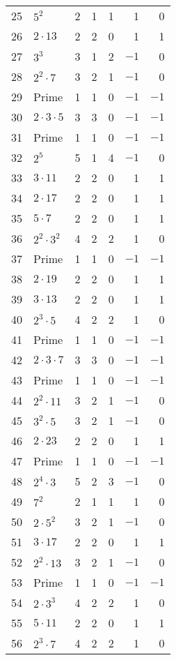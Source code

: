 \documentclass[12pt]{article}
\begin{document}
\begin{tabular}{|r|l|r|r|r|r|r|}
25 & $5^2$ & 2 & 1 & 1 & 1 & 0 \\
26 & $2 \cdot 13$ & 2 & 2 & 0 & 1 & 1 \\
27 & $3^3$ & 3 & 1 & 2 & $-1$ & 0 \\
28 & $2^2 \cdot 7$ & 3 & 2 & 1 & $-1$ & 0 \\
29 & Prime & 1 & 1 & 0 & $-1$ & $-1$ \\
30 & $2 \cdot 3 \cdot 5$ & 3 & 3 & 0 & $-1$ & $-1$ \\
31 & Prime & 1 & 1 & 0 & $-1$ & $-1$ \\
32 & $2^5$ & 5 & 1 & 4 & $-1$ & 0 \\
33 & $3 \cdot 11$ & 2 & 2 & 0 & 1 & 1 \\
34 & $2 \cdot 17$ & 2 & 2 & 0 & 1 & 1 \\
35 & $5 \cdot 7$ & 2 & 2 & 0 & 1 & 1 \\
36 & $2^2 \cdot 3^2$ & 4 & 2 & 2 & 1 & 0 \\
37 & Prime & 1 & 1 & 0 & $-1$ & $-1$ \\
38 & $2 \cdot 19$ & 2 & 2 & 0 & 1 & 1 \\
39 & $3 \cdot 13$ & 2 & 2 & 0 & 1 & 1 \\
40 & $2^3 \cdot 5$ & 4 & 2 & 2 & 1 & 0 \\
41 & Prime & 1 & 1 & 0 & $-1$ & $-1$ \\
42 & $2 \cdot 3 \cdot 7$ & 3 & 3 & 0 & $-1$ & $-1$ \\
43 & Prime & 1 & 1 & 0 & $-1$ & $-1$ \\
44 & $2^2 \cdot 11$ & 3 & 2 & 1 & $-1$ & 0 \\
45 & $3^2 \cdot 5$ & 3 & 2 & 1 & $-1$ & 0 \\
46 & $2 \cdot 23$ & 2 & 2 & 0 & 1 & 1 \\
47 & Prime & 1 & 1 & 0 & $-1$ & $-1$ \\
48 & $2^4 \cdot 3$ & 5 & 2 & 3 & $-1$ & 0 \\
49 & $7^2$ & 2 & 1 & 1 & 1 & 0 \\
50 & $2 \cdot 5^2$ & 3 & 2 & 1 & $-1$ & 0 \\
51 & $3 \cdot 17$ & 2 & 2 & 0 & 1 & 1 \\
52 & $2^2 \cdot 13$ & 3 & 2 & 1 & $-1$ & 0 \\
53 & Prime & 1 & 1 & 0 & $-1$ & $-1$ \\
54 & $2 \cdot 3^3$ & 4 & 2 & 2 & 1 & 0 \\
55 & $5 \cdot 11$ & 2 & 2 & 0 & 1 & 1 \\
56 & $2^3 \cdot 7$ & 4 & 2 & 2 & 1 & 0 \\

\end{tabular}
\end{document}
